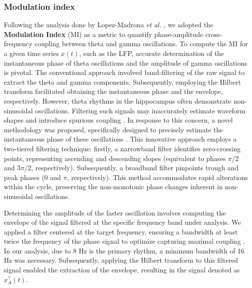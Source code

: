 \documentclass[../main.tex]{subfiles}
\begin{document}
\subsubsection{Modulation index}
Following the analysis done by Lopez-Madrona \textit{et al.} \citep{lopez-madrona_different_2020}, we adopted the \textbf{Modulation Index} (MI) as a metric to quantify phase-amplitude cross-frequency coupling between theta and gamma oscillations.
To compute the MI for a given time series $x(t)$, such as the LFP, accurate determination of the instantaneous phase of theta oscillations and the amplitude of gamma oscillations is pivotal.
The conventional approach involved band-filtering of the raw signal to extract the theta and gamma components.
Subsequently, employing the Hilbert transform facilitated obtaining the instantaneous phase and the envelope, respectively.
However, theta rhythms in the hippocampus often demonstrate non-sinusoidal oscillations. Filtering such signals may inaccurately estimate waveform shapes and introduce spurious coupling \citep{cole2017brain, kramer2008sharp}.
In response to this concern, a novel methodology was proposed, specifically designed to precisely estimate the instantaneous phase of these oscillations \citep{cole2019cycle}. This innovative approach employs a two-tiered filtering technique: firstly, a narrowband filter identifies zero-crossing points, representing ascending and descending slopes (equivalent to phases $\pi/2$ and $3\pi/2$, respectively).
Subsequently, a broadband filter pinpoints trough and peak phases (0 and $\pi$, respectively).
This method accommodates rapid alterations within the cycle, preserving the non-monotonic phase changes inherent in non-sinusoidal oscillations.

Determining the amplitude of the faster oscillation involves computing the envelope of the signal filtered at the specific frequency band under analysis.
We applied a filter centered at the target frequency, ensuring a bandwidth at least twice the frequency of the phase signal to optimize capturing maximal coupling \citep{aru2015untangling}.
In our analysis, due to 8 Hz is the primary rhythm, a minimum bandwidth of 16 Hz was necessary.
Subsequently, applying the Hilbert transform to this filtered signal enabled the extraction of the envelope, resulting in the signal denoted as $x^{\gamma}_A(t)$.
\end{document}
